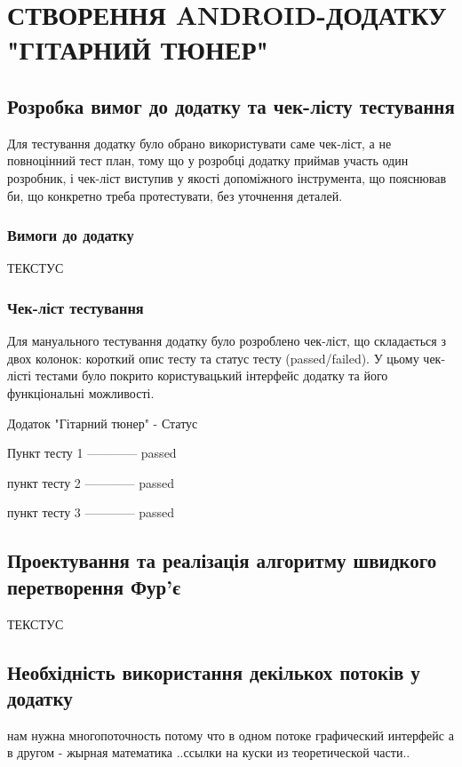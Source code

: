 \section{СТВОРЕННЯ ANDROID-ДОДАТКУ "ГІТАРНИЙ ТЮНЕР"}

\subsection{Розробка вимог до додатку та чек-лісту тестування}

Для тестування додатку було обрано використувати саме чек-ліст, а не повноцінний тест план, тому що у розробці додатку приймав участь один розробник, і чек-ліст виступив у якості допоміжного інструмента, що пояснював би, що конкретно треба протестувати, без уточнення деталей.

\subsubsection{Вимоги до додатку}

ТЕКСТУС

\subsubsection{Чек-ліст тестування}

Для мануального тестування додатку було розроблено чек-ліст, що складається з двох колонок: короткий опис тесту та статус тесту (passed/failed). У цьому чек-лісті тестами було покрито користувацький інтерфейс додатку та його функціональні можливості.

Додаток "Гітарний тюнер" - Статус

Пункт тесту 1 ------------ passed

пункт тесту 2 ------------ passed

пункт тесту 3 ------------ passed


\subsection{Проектування та реалізація алгоритму швидкого перетворення Фур'є}

ТЕКСТУС

\subsection{Необхідність використання декількох потоків у додатку}

нам нужна многопоточность потому что в одном потоке графический интерфейс а в другом - жырная математика
..ссылки на куски из теоретической части..

